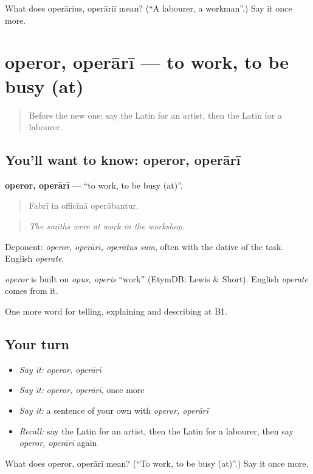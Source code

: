 \begin{tcolorbox}[breakable,colback=teal!4,colframe=teal!35!black,title={Before you move on}]
What does operārius, operāriī mean? (\textquotedblleft{}A labourer, a workman\textquotedblright{}.) Say it once more.
\end{tcolorbox}
\section[operor, operārī]{operor, operārī — to work, to be busy (at)}

\label{lesson:LA-C376-operor}



\begin{quote}
Before the new one: say the Latin for an artist, then the Latin for a labourer.
\end{quote}

\subsection*{You'll want to know: operor, operārī}
\textbf{operor, operārī} — \textquotedblleft{}to work, to be busy (at)\textquotedblright{}.

\begin{quote}
Fabrī in officīnā operābantur.
\end{quote}

\begin{quote}
\emph{The smiths were at work in the workshop.}
\end{quote}

Deponent: \emph{operor, operārī, operātus sum}, often with the dative of the task. English \emph{operate}.

\begin{cousinweb}
\emph{operor} is built on \emph{opus, operis} \textquotedblleft{}work\textquotedblright{} (EtymDB; Lewis \& Short). English \emph{operate} comes from it.
\end{cousinweb}

\begin{grammarlens}[title={What you've built}]
One more word for telling, explaining and describing at B1.
\end{grammarlens}

\subsection*{Your turn}
\begin{itemize}
\raggedright
  \item \emph{Say it:} \emph{operor, operārī}
  \item \emph{Say it:} \emph{operor, operārī}, once more
  \item \emph{Say it:} a sentence of your own with \emph{operor, operārī}
  \item \emph{Recall:} say the Latin for an artist, then the Latin for a labourer, then say \emph{operor, operārī} again
\end{itemize}

\begin{tcolorbox}[breakable,colback=teal!4,colframe=teal!35!black,title={Before you move on}]
What does operor, operārī mean? (\textquotedblleft{}To work, to be busy (at)\textquotedblright{}.) Say it once more.
\end{tcolorbox}
